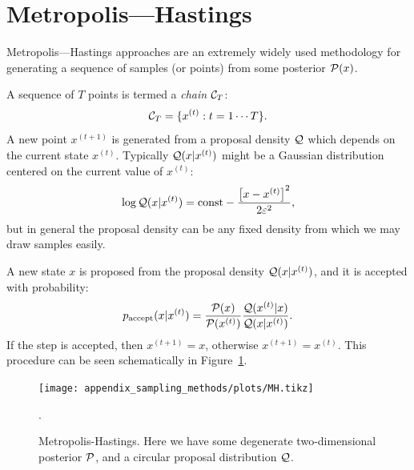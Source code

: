 \section{Metropolis---Hastings}
\label{sec:sm:mh}
Metropolis---Hastings approaches are an extremely widely used methodology for generating a sequence of samples (or points) from some posterior $\mathcal{P}(x)$.

A sequence of $T$ points is termed a {\em chain\/} $\mathcal{C}_T$:
\begin{equation}
  \mathcal{C}_T = \{ x^{(t)}: t=1\cdots T \}.
\end{equation}
A new point $x^{(t+1)}$ is generated from a proposal density $\mathcal{Q}$ which depends on the current state $x^{(t)}$. Typically $\mathcal{Q}(x|x^{(t)})$ might be a Gaussian distribution centered on the current value of $x^{(t)}$:
\begin{equation}
  \log \mathcal{Q}(x|x^{(t)}) = \text{const} -\frac{{\left[ x-x^{(t)} \right]}^2}{2\varepsilon^2},
\end{equation}
but in general the proposal density can be any fixed density from which we may draw samples easily.

A new state $x$ is proposed from the proposal density $\mathcal{Q}(x|x^{(t)})$, and it is accepted with probability:
\begin{equation}
  p_\mathrm{accept}(x|x^{(t)}) = \frac{\mathcal{P}(x)}{\mathcal{P}(x^{(t)})}\frac{\mathcal{Q}(x^{(t)}|x)}{\mathcal{Q}(x|x^{(t)})}.
\end{equation}
If the step is accepted, then $x^{(t+1)}=x$, otherwise $x^{(t+1)} = x^{(t)}$. This procedure can be seen schematically in Figure~\ref{fig:sm:MH}.
\begin{figure}[ht]
  \centering
  \texttt{[image: appendix\_sampling\_methods/plots/MH.tikz]}
  \caption{Metropolis-Hastings. Here we have some degenerate two-dimensional posterior $\mathcal{P}$, and a circular proposal distribution $\mathcal{Q}$.\label{fig:sm:MH}}.
\end{figure}


